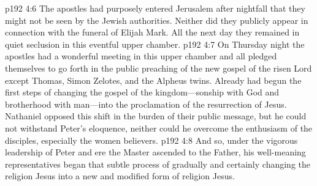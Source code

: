 \pc \vs p192 4:6 The apostles had purposely entered Jerusalem after nightfall that they might not be seen by the Jewish authorities. Neither did they publicly appear in connection with the funeral of Elijah Mark. All the next day they remained in quiet seclusion in this eventful upper chamber.
\vs p192 4:7 On Thursday night the apostles had a wonderful meeting in this upper chamber and all pledged themselves to go forth in the public preaching of the new gospel of the risen Lord except Thomas, Simon Zelotes, and the Alpheus twins. Already had begun the first steps of changing the gospel of the kingdom---sonship with God and brotherhood with man---into the proclamation of the resurrection of Jesus. Nathaniel opposed this shift in the burden of their public message, but he could not withstand Peter’s eloquence, neither could he overcome the enthusiasm of the disciples, especially the women believers.
\vs p192 4:8 And so, under the vigorous leadership of Peter and ere the Master ascended to the Father, his well\hyp{}meaning representatives began that subtle process of gradually and certainly changing the religion  Jesus into a new and modified form of religion  Jesus.
